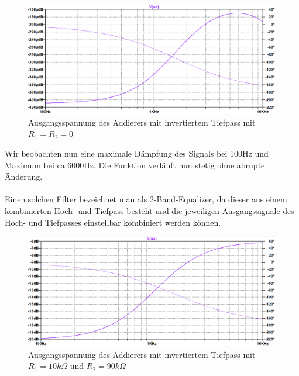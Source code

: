 \begin{figure}[htb]
    \includegraphics[width=16cm]{./pictures/Gesamtschaltung_Invertiert}
    \caption{Ausgangsspannung des Addierers mit invertiertem Tiefpass mit $R_1 = R_2 = 0$}
    \label{fig:AddiererAusgangsspannungInvertiert}
\end{figure}

Wir beobachten nun eine maximale Dämpfung des Signals bei 100Hz und Maximum bei ca 6000Hz. Die Funktion verläuft nun stetig ohne abrupte Änderung.
\\
\\
Einen solchen Filter bezeichnet man als 2-Band-Equalizer, da dieser aus einem kombinierten Hoch- und Tiefpass besteht und die jeweiligen Ausgangssignale des Hoch- und Tiefpasses einstellbar kombiniert werden können.

\newpage
\begin{figure}[htb]
    \includegraphics[width=16cm]{./pictures/Gesamtschaltung_Invertiert_10_90}
    \caption{Ausgangsspannung des Addierers mit invertiertem Tiefpass mit $R_1 = 10k\Omega$ und $R_2 = 90k\Omega$}
    \label{fig:AddiererAusgangsspannungInvertiert}
\end{figure}

